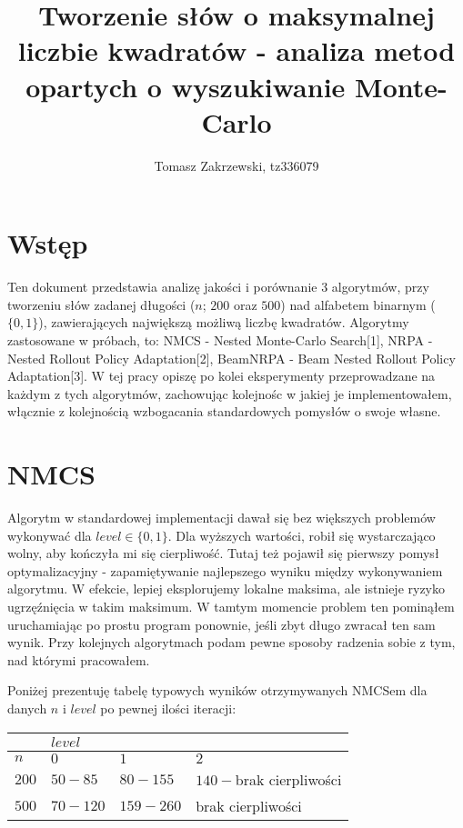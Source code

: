 \documentclass[a4paper,10pt]{article}
\title{Tworzenie słów o maksymalnej liczbie kwadratów - analiza metod opartych o wyszukiwanie Monte-Carlo}
\author{Tomasz Zakrzewski, tz336079}
\begin{document}
\maketitle

\section{Wstęp}
Ten dokument przedstawia analizę jakości i porównanie 3 algorytmów, przy tworzeniu słów zadanej długości ($n$; $200$ oraz $500$) 
nad alfabetem binarnym ($\{0, 1\}$), zawierających największą możliwą liczbę kwadratów. Algorytmy zastosowane w próbach, to: NMCS
- Nested Monte-Carlo Search[1], NRPA - Nested Rollout Policy Adaptation[2], BeamNRPA - Beam Nested Rollout Policy Adaptation[3].
W tej pracy opiszę po kolei eksperymenty przeprowadzane na każdym z tych algorytmów, zachowując kolejnośc w jakiej je implementowałem,
włącznie z kolejnością wzbogacania standardowych pomysłów o swoje własne.

\section{NMCS}
Algorytm w standardowej implementacji dawał się bez większych problemów wykonywać dla $level \in \{0, 1\}$. Dla wyższych wartości, robił
się wystarczająco wolny, aby kończyła mi się cierpliwość. Tutaj też pojawił się pierwszy pomysł optymalizacyjny - zapamiętywanie najlepszego
wyniku między wykonywaniem algorytmu. W efekcie, lepiej eksplorujemy lokalne maksima, ale istnieje ryzyko ugrzęźnięcia w takim maksimum. 
W tamtym momencie problem ten pominąłem uruchamiając po prostu program ponownie, jeśli zbyt długo zwracał ten sam wynik. Przy kolejnych
algorytmach podam pewne sposoby radzenia sobie z tym, nad którymi pracowałem.

Poniżej prezentuję tabelę typowych wyników otrzymywanych NMCSem dla danych $n$ i $level$ po pewnej ilości iteracji: \\
\begin{adjustbox}{center}
\begin{tabularx}{0.7\linewidth}{|X|X|X|X| }
  \hline
  & \multicolumn{3}{|X|}{$level$} \\
  \hline
  $n$ & $0$ & $1$ & $2$ \\
  \hline
  $200$ & $50 - 85$ & $80 - 155$ & $140-$brak cierpliwości \\
  \hline
  $500$ & $70 - 120$ & $159 - 260$ & brak cierpliwości \\
  \hline
\end{tabularx}
\end{adjustbox}
\end{document}
